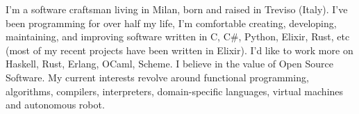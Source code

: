 \documentclass[9pt]{developercv}
\begin{document}
\begin{minipage}[t]{0.5\textwidth}
	\vspace{-\baselineskip}

	I'm a software craftsman living in Milan, born and raised in Treviso (Italy). I've been programming for over half my life, I'm comfortable creating, developing, maintaining, and improving software written in C, C\#, Python, Elixir, Rust, etc (most of my recent projects have been written in Elixir). I'd like to work more on Haskell, Rust, Erlang, OCaml, Scheme. I believe in the value of Open Source Software. My current interests revolve around functional programming, algorithms, compilers, interpreters, domain-specific languages, virtual machines and autonomous robot.
\end{minipage}
\hfill
\begin{minipage}[t]{0.4\textwidth}
	\vspace{-\baselineskip}
	\begin{barchart}{5.5}
	\end{barchart}
\end{minipage}



\end{document}
